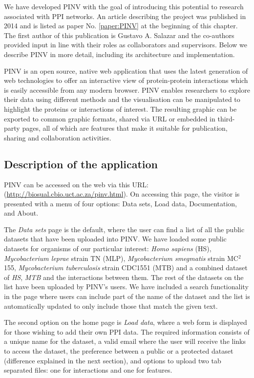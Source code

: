 We have developed PINV with the goal of introducing this potential to research associated with PPI networks. An article describing the project was published in 2014 and is listed as paper No. \ref{paper:PINV} at the beginning of this chapter. The first author of this publication is Gustavo A. Salazar and the co-authors provided input in line with their roles as collaborators and supervisors. Below we describe PINV in more detail, including its architecture and implementation.

PINV is an open source, native web application that uses the latest generation of web technologies to offer an interactive view of protein-protein interactions which is easily accessible from any modern browser. PINV enables researchers to explore their data using different methods and the visualisation can be manipulated to highlight the proteins or interactions of interest. The resulting graphic can be exported to common graphic formats, shared via URL or embedded in third-party pages, all of which are features that make it suitable for publication, sharing and collaboration activities.

\subsection{Description of the application} \label{section:pinv_gui}

PINV can be accessed on the web via this URL: (\url{http://biosual.cbio.uct.ac.za/pinv.html}). On accessing this page, the visitor is presented with a menu of four options: Data sets, Load data, Documentation, and About. 

The \emph{Data sets} page is the default, where the user can find a list of all the public datasets that have been uploaded into PINV. We have loaded some public datasets for organisms of our particular interest: \emph{Homo sapiens} (HS), \emph{Mycobacterium leprae} strain TN (MLP), \emph{Mycobacterium smegmatis} strain MC$^2$155, \emph{Mycobacterium tuberculosis} strain CDC1551  (MTB) and a combined dataset of \emph{HS}, \emph{MTB} and the interactions between them. The rest of the datasets on the list have been uploaded by PINV's users. We have included a search functionality in the page where users can include part of the name of the dataset and the list is automatically updated to only include those that match the given text.

The second option on the home page is \emph{Load data}, where a web form is displayed for those wishing to add their own PPI data. The required information consists of a unique name for the dataset, a valid email where the user will receive the links to access the dataset, the preference between a public or a protected dataset (difference explained in the next section), and options to upload two tab separated files: one for interactions and one for features.

